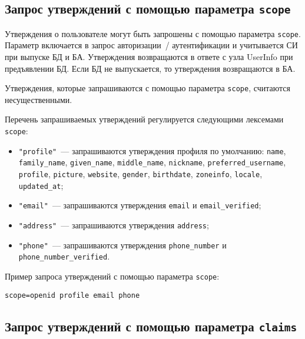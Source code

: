 \label{CLAIMS.ReqWith}

\subsection{Запрос утверждений с помощью параметра \lstinline{scope}} 
\label{CLAIMS.ReqWithScope}

Утверждения о пользователе могут быть запрошены с помощью параметра
\lstinline{scope}. Параметр включается в запрос авторизации~/ аутентификации 
и учитывается СИ при выпуске БД и БА.
%
Утверждения возвращаются в ответе с узла UserInfo при предъявлении 
БД. 
%
Если БД не выпускается, то утверждения возвращаются в БА. 

Утверждения, которые запрашиваются с помощью параметра \lstinline{scope},
считаются несущественными.

Перечень запрашиваемых утверждений регулируется следующими лексемами 
\lstinline{scope}: 
\begin{itemize}
\item
\lstinline{"profile"}~--- запрашиваются утверждения профиля по умолчанию: 
\lstinline{name}, 
\lstinline{family_name}, 
\lstinline{given_name}, 
\lstinline{middle_name}, 
\lstinline{nickname},
\lstinline{preferred_username}, 
\lstinline{profile}, 
\lstinline{picture}, 
\lstinline{website}, 
\lstinline{gender}, 
\lstinline{birthdate},
\lstinline{zoneinfo}, 
\lstinline{locale}, 
\lstinline{updated_at};

\item
\lstinline{"email"}~--- 
запрашиваются утверждения
\lstinline{email} и \lstinline{email_verified};

\item
\lstinline{"address"}~--- 
запрашиваются утверждения 
\lstinline{address};

\item
\lstinline{"phone"}~--- 
запрашиваются утверждения
\lstinline{phone_number} и \lstinline{phone_number_verified}.
\end{itemize}

Пример запроса утверждений с помощью параметра \lstinline{scope}:
\begin{lstlisting}
scope=openid profile email phone
\end{lstlisting}

\subsection{Запрос утверждений с помощью параметра \lstinline{claims}}
\label{CLAIMS.ReqWithClaims}

